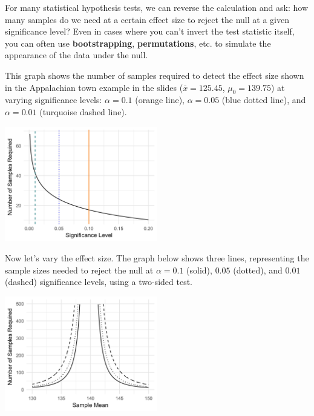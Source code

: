 For many statistical hypothesis tests, we can reverse the calculation and ask: how many samples do we need at a certain effect size to reject the null at a given significance level? Even in cases where you can't invert the test statistic itself, you can often use \textbf{bootstrapping}, \textbf{permutations}, etc. to simulate the appearance of the data under the null. 

This graph shows the number of samples required to detect the effect size shown in the Appalachian town example in the slides ($\overline{x} = 125.45$, $\mu_0 = 139.75$) at varying significance levels: $\alpha = 0.1$ (orange line), $\alpha = 0.05$ (blue dotted line), and $\alpha = 0.01$ (turquoise dashed line). 

\begin{center}
\includegraphics[width=0.5\textwidth]{img/hyp-z-test-power-curve-1.png}
\end{center}

Now let's vary the effect size. The graph below shows three lines, representing the sample sizes needed to reject the null at $\alpha = 0.1$ (solid), $0.05$ (dotted), and $0.01$ (dashed) significance levels, using a two-sided test.

\begin{center}
\includegraphics[width=0.5\textwidth]{img/hyp-z-test-power-curve-2.png}
\end{center}
